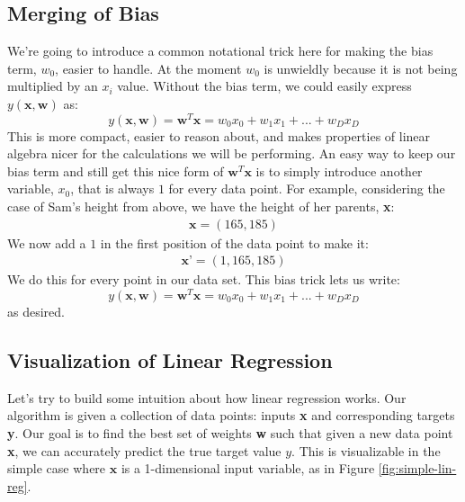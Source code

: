 \subsection{Merging of Bias}
We're going to introduce a common notational trick here for making the bias term, $w_{0}$, easier to handle. At the moment $w_{0}$ is unwieldly because it is not being multiplied by an $x_{i}$ value. Without the bias term, we could easily express $y(\textbf{x}, \textbf{w})$ as:
\begin{equation}
    y(\textbf{x}, \textbf{w}) = \textbf{w}^{T}\textbf{x} = w_{0}x_{0} + w_{1}x_{1} + ... + w_{D}x_{D}
\end{equation}
 This is more compact, easier to reason about, and makes properties of linear algebra nicer for the calculations we will be performing. An easy way to keep our bias term and still get this nice form of $\textbf{w}^{T}\textbf{x}$ is to simply introduce another variable, $x_{0}$, that is always $1$ for every data point. For example, considering the case of Sam's height from above, we have the height of her parents, \textbf{x}:
\begin{align*}
    \textbf{x} = (165, 185)
\end{align*}
We now add a $1$ in the first position of the data point to make it:
\begin{align*}
    \textbf{x'} = (1, 165, 185)
\end{align*}
We do this for every point in our data set. This bias trick lets us write:
\begin{equation}
    y(\textbf{x}, \textbf{w}) = \textbf{w}^{T}\textbf{x} = w_{0}x_{0} + w_{1}x_{1} + ... + w_{D}x_{D}
\end{equation}
as desired.

\subsection{Visualization of Linear Regression}
Let's try to build some intuition about how linear regression works. Our algorithm is given a collection of data points: inputs \textbf{x} and corresponding targets \textbf{y}. Our goal is to find the best set of weights \textbf{w} such that given a new data point \textbf{x}, we can accurately predict the true target value $y$. This is visualizable in the simple case where $\textbf{x}$ is a 1-dimensional input variable, as in Figure \ref{fig:simple-lin-reg}.

